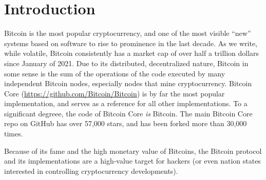 \section{Introduction}

Bitcoin is the most popular cryptocurrency, and one of the most visible ``new'' systems based on software to rise to prominence in the last decade.  As we write, while volatile, Bitcoin consistently has a market cap of over half a trillion dollars since January of 2021.  Due to its distributed, decentralized nature, Bitcoin in some sense is the sum of the operations of the code executed by many independent Bitcoin nodes, especially nodes that mine cryptocurrency.  Bitcoin Core (\url{https://github.com/Bitcoin/Bitcoin}) is by far the most popular implementation, and serves as a reference for all other implementations.  To a significant degreee, the code of Bitcoin Core \emph{is} Bitcoin.  The main Bitcoin Core repo on GitHub has over 57,000 stars, and has been forked more than 30,000 times.

Because of its fame and the high monetary value of Bitcoins, the Bitcoin protocol and its implementations are a high-value target for hackers (or even nation states interested in controlling cryptocurrency developments).

